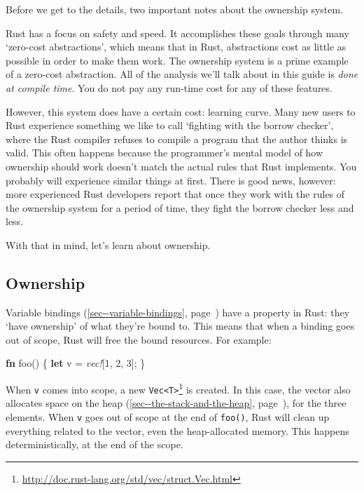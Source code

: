 \documentclass[a4paper,]{book}
\renewcommand*{\hyperref}[2][\ar]{%
  \def\ar{#2}%
  #2 (\autoref{#1}, page~\pageref{#1})}
\newenvironment{Shaded}{\begin{snugshade}}{\end{snugshade}}
\newcommand{\KeywordTok}[1]{\textcolor[rgb]{0.13,0.29,0.53}{\textbf{{#1}}}}
\newcommand{\DecValTok}[1]{\textcolor[rgb]{0.00,0.00,0.81}{{#1}}}
\newcommand{\PreprocessorTok}[1]{\textcolor[rgb]{0.56,0.35,0.01}{\textit{{#1}}}}
\newcommand{\NormalTok}[1]{{#1}}
\renewcommand{\href}[2]{#2\footnote{\url{#1}}}
\begin{document}
Before we get to the details, two important notes about the ownership
system.

Rust has a focus on safety and speed. It accomplishes these goals
through many `zero-cost abstractions', which means that in Rust,
abstractions cost as little as possible in order to make them work. The
ownership system is a prime example of a zero-cost abstraction. All of
the analysis we'll talk about in this guide is \emph{done at compile
time}. You do not pay any run-time cost for any of these features.

However, this system does have a certain cost: learning curve. Many new
users to Rust experience something we like to call `fighting with the
borrow checker', where the Rust compiler refuses to compile a program
that the author thinks is valid. This often happens because the
programmer's mental model of how ownership should work doesn't match the
actual rules that Rust implements. You probably will experience similar
things at first. There is good news, however: more experienced Rust
developers report that once they work with the rules of the ownership
system for a period of time, they fight the borrow checker less and
less.

With that in mind, let's learn about ownership.

\subsection{Ownership}\label{ownership}

\hyperref[sec--variable-bindings]{Variable bindings} have a property in
Rust: they `have ownership' of what they're bound to. This means that
when a binding goes out of scope, Rust will free the bound resources.
For example:

\begin{Shaded}
\begin{Highlighting}[]
\KeywordTok{fn} \NormalTok{foo() \{}
    \KeywordTok{let} \NormalTok{v = }\PreprocessorTok{vec!}\NormalTok{[}\DecValTok{1}\NormalTok{, }\DecValTok{2}\NormalTok{, }\DecValTok{3}\NormalTok{];}
\NormalTok{\}}
\end{Highlighting}
\end{Shaded}

When \texttt{v} comes into scope, a new
\href{http://doc.rust-lang.org/std/vec/struct.Vec.html}{\texttt{Vec\textless{}T\textgreater{}}}
is created. In this case, the vector also allocates space on
\hyperref[sec--the-stack-and-the-heap]{the heap}, for the three
elements. When \texttt{v} goes out of scope at the end of
\texttt{foo()}, Rust will clean up everything related to the vector,
even the heap-allocated memory. This happens deterministically, at the
end of the scope.
\end{document}
